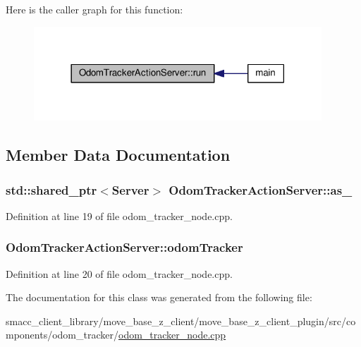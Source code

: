 Here is the caller graph for this function\+:\nopagebreak
\begin{figure}[H]
\begin{center}
\leavevmode
\includegraphics[width=306pt]{classOdomTrackerActionServer_a8ab6984c7383949a048d72437e9f79d3_icgraph}
\end{center}
\end{figure}




\subsection{Member Data Documentation}
\subsubsection[{\texorpdfstring{as\+\_\+}{as_}}]{\setlength{\rightskip}{0pt plus 5cm}std\+::shared\+\_\+ptr$<${\bf Server}$>$ Odom\+Tracker\+Action\+Server\+::as\+\_\+}\hypertarget{classOdomTrackerActionServer_a28bed1d95003d837b2b47053dbc66878}{}\label{classOdomTrackerActionServer_a28bed1d95003d837b2b47053dbc66878}


Definition at line 19 of file odom\+\_\+tracker\+\_\+node.\+cpp.

\subsubsection[{\texorpdfstring{odom\+Tracker}{odomTracker}}]{ Odom\+Tracker\+Action\+Server\+::odom\+Tracker}\hypertarget{classOdomTrackerActionServer_a3e5c4328d3206fbd2fd2708f0aefe651}{}\label{classOdomTrackerActionServer_a3e5c4328d3206fbd2fd2708f0aefe651}


Definition at line 20 of file odom\+\_\+tracker\+\_\+node.\+cpp.



The documentation for this class was generated from the following file\+:\begin{DoxyCompactItemize}
\item 
smacc\+\_\+client\+\_\+library/move\+\_\+base\+\_\+z\+\_\+client/move\+\_\+base\+\_\+z\+\_\+client\+\_\+plugin/src/components/odom\+\_\+tracker/\hyperlink{odom__tracker__node_8cpp}{odom\+\_\+tracker\+\_\+node.\+cpp}\end{DoxyCompactItemize}
